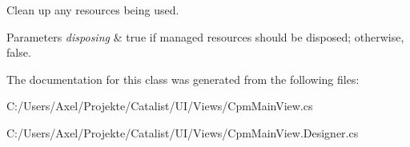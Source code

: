 Clean up any resources being used. 


\begin{DoxyParams}{Parameters}
{\em disposing} & true if managed resources should be disposed; otherwise, false.\\
\hline
\end{DoxyParams}


The documentation for this class was generated from the following files\+:\begin{DoxyCompactItemize}
\item 
C\+:/\+Users/\+Axel/\+Projekte/\+Catalist/\+U\+I/\+Views/Cpm\+Main\+View.\+cs\item 
C\+:/\+Users/\+Axel/\+Projekte/\+Catalist/\+U\+I/\+Views/Cpm\+Main\+View.\+Designer.\+cs\end{DoxyCompactItemize}
